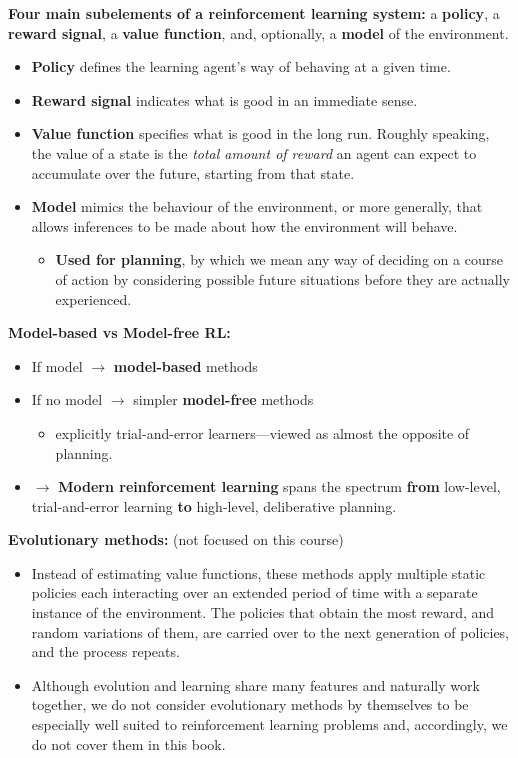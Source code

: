 \documentclass[12pt, a4paper]{article}
\begin{document}
\textbf{Four main subelements of a reinforcement learning system:} a \textbf{policy}, a \textbf{reward signal}, a \textbf{value function}, and, optionally, a \textbf{model} of the environment.

\begin{itemize}
  \item \textbf{Policy} defines the learning agent's way of behaving at a given time.
  \item \textbf{Reward signal} indicates what is good in an immediate sense.
  \item \textbf{Value function} specifies what is good in the long run. Roughly speaking, the value of a state is the \emph{total amount of reward} an agent can expect to accumulate over the future, starting from that state.
  \item \textbf{Model} mimics the behaviour of the environment, or more generally, that allows inferences to be made about how the environment will behave.
  \begin{itemize}
    \item \textbf{Used for planning}, by which we mean any way of deciding on a course of action by considering possible future situations before they are actually experienced.
  \end{itemize}
\end{itemize}



\textbf{Model-based vs Model-free RL:}

\begin{itemize}
  \item If model \(\rightarrow\) \textbf{model-based} methods
  \item If no model \(\rightarrow\) simpler \textbf{model-free} methods
  \begin{itemize}
    \item explicitly trial-and-error learners---viewed as almost the opposite of planning.
  \end{itemize}
  \item \(\rightarrow\) \textbf{Modern reinforcement learning} spans the spectrum \textbf{from} low-level, trial-and-error learning \textbf{to} high-level, deliberative planning.
\end{itemize}


\textbf{Evolutionary methods:} (not focused on this course)

\begin{itemize}
  \item Instead of estimating value functions, these methods apply multiple static policies each interacting over an extended period of time with a separate instance of the environment. The policies that obtain the most reward, and random variations of them, are carried over to the next generation of policies, and the process repeats.
  \item Although evolution and learning share many features and naturally work together, we do not consider evolutionary methods by themselves to be especially well suited to reinforcement learning problems and, accordingly, we do not cover them
  in this book.
\end{itemize}
\end{document}
